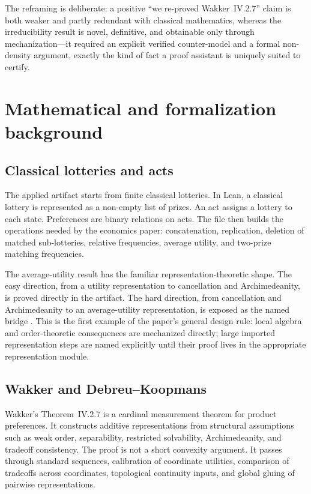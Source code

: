 \documentclass[11pt,english]{article}
\newcommand{\code}[1]{\texttt{\detokenize{#1}}}
\begin{document}
The reframing is deliberate: a positive ``we re-proved Wakker~IV.2.7'' claim is
both weaker and partly redundant with classical mathematics, whereas the
irreducibility result is novel, definitive, and obtainable only through
mechanization---it required an explicit verified counter-model and a formal
non-density argument, exactly the kind of fact a proof assistant is uniquely
suited to certify.

\section{Mathematical and formalization background}
\label{sec:background}

\subsection{Classical lotteries and acts}

The applied artifact starts from finite classical lotteries.  In Lean, a classical lottery is represented as a non-empty list of prizes.  An act assigns a lottery to each state.  Preferences are binary relations on acts.  The file then builds the operations needed by the economics paper: concatenation, replication, deletion of matched sub-lotteries, relative frequencies, average utility, and two-prize matching frequencies.

The average-utility result has the familiar representation-theoretic shape.  The easy direction, from a utility representation to cancellation and Archimedeanity, is proved directly in the artifact.  The hard direction, from cancellation and Archimedeanity to an average-utility representation, is exposed as the named bridge \code{AverageUtilityHardDirection}.  This is the first example of the paper's general design rule: local algebra and order-theoretic consequences are mechanized directly; large imported representation steps are named explicitly until their proof lives in the appropriate representation module.

\subsection{Wakker and Debreu--Koopmans}

Wakker's Theorem~IV.2.7 is a cardinal measurement theorem for product preferences.  It constructs additive representations from structural assumptions such as weak order, separability, restricted solvability, Archimedeanity, and tradeoff consistency.  The proof is not a short convexity argument.  It passes through standard sequences, calibration of coordinate utilities, comparison of tradeoffs across coordinates, topological continuity inputs, and global gluing of pairwise representations.
\end{document}
